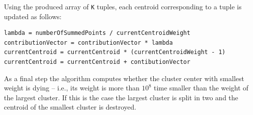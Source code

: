 \documentclass{l4proj}
\begin{document}
Using the produced array of \texttt{K} tuples, each centroid corresponding to a tuple is updated as follows:

\begin{center}
\begin{BVerbatim}
lambda = numberOfSummedPoints / currentCentroidWeight
contributionVector = contributionVector * lambda
currentCentroid = currentCentroid * (currentCentroidWeight - 1)
currentCentroid = currentCentroid + contibutionVector
\end{BVerbatim}
\end{center}

As a final step the algorithm computes whether the cluster center with smallest weight is dying -- i.e., its weight is more than $10^8$ time smaller than the weight of the largest cluster. If this is the case the largest cluster is split in two and the centroid of the smallest cluster is destroyed.
\end{document}

